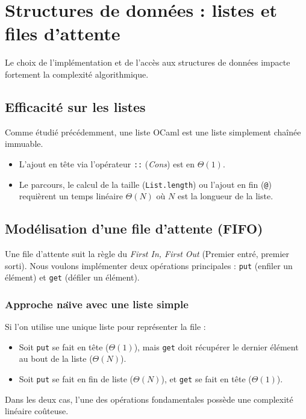 \documentclass{article}
\begin{document}
\section{Structures de données : listes et files d'attente}

Le choix de l'implémentation et de l'accès aux structures de données impacte fortement la complexité algorithmique.

\subsection{Efficacité sur les listes}

Comme étudié précédemment, une liste OCaml est une liste simplement chaînée immuable. 
\begin{itemize}
    \item L'ajout en tête via l'opérateur \lstinline|::| (\textit{Cons}) est en $\Theta(1)$.
    \item Le parcours, le calcul de la taille (\lstinline|List.length|) ou l'ajout en fin (\lstinline|@|) requièrent un temps linéaire $\Theta(N)$ où $N$ est la longueur de la liste.
\end{itemize}

\subsection{Modélisation d'une file d'attente (FIFO)}

Une file d'attente suit la règle du \textit{First In, First Out} (Premier entré, premier sorti). Nous voulons implémenter deux opérations principales : \texttt{put} (enfiler un élément) et \texttt{get} (défiler un élément).

\subsubsection{Approche na\"\i ve avec une liste simple}
Si l'on utilise une unique liste pour représenter la file :
\begin{itemize}
    \item Soit \texttt{put} se fait en tête ($\Theta(1)$), mais \texttt{get} doit récupérer le dernier élément au bout de la liste ($\Theta(N)$).
    \item Soit \texttt{put} se fait en fin de liste ($\Theta(N)$), et \texttt{get} se fait en tête ($\Theta(1)$).
\end{itemize}
Dans les deux cas, l'une des opérations fondamentales possède une complexité linéaire coûteuse.
\end{document}
